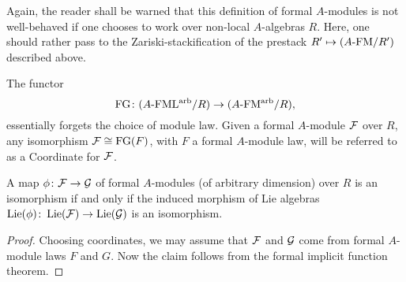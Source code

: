 \documentclass[../main.tex]{subfiles}
\begin{document}
Again, the reader shall be warned that this definition of formal 
$A$-modules is not well-behaved if one chooses to work over non-local
$A$-algebras $R$. Here, one should rather pass to the Zariski-stackification
of the prestack $R' \mapsto {({A}\textnormal-\allowbreak\mathrm{FM}/{R'})}$ described above.

The functor
\begin{equation*}
  \textnormal{FG}\colon  {({A}\textnormal-\allowbreak\mathrm{FML^{arb}}/{R})} \to {({A}\textnormal-\allowbreak\mathrm{FM^{arb}}/{R})},
\end{equation*}
essentially forgets the choice of module law. Given a formal $A$-module
$\mathcal{F}$ over $R$, any isomorphism $\mathcal{F} \cong \textnormal{FG}(F)$, with $F$ a formal $A$-module
law, will be referred to as a Coordinate for $\mathcal{F}$.


\begin{lem}\label{lem:IsosCheckOnLie}
  A map $\phi\colon  \mathcal{F} \to \mathcal{G}$ of formal $A$-modules (of arbitrary
  dimension) over $R$ is an isomorphism if and only if the induced morphism of
  Lie algebras $\operatorname{Lie}(\phi)\colon  \operatorname{Lie}(\mathcal{F}) \to \operatorname{Lie}(\mathcal{G})$ is an isomorphism.
\begin{proof}
  Choosing coordinates, we may assume that $\mathcal{F}$ and $\mathcal{G}$ come from formal $A$-module
  laws $F$ and $G$. Now the claim follows from the formal implicit
  function theorem.
\end{proof}
\end{lem}
\end{document}
